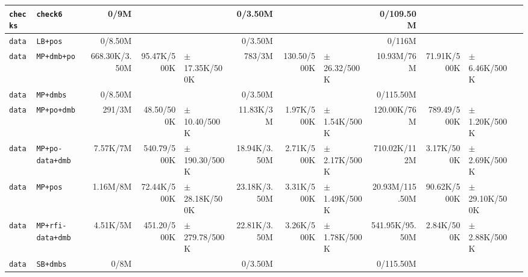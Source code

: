 \begin{tabular}{l l  | r r l | r r l | r r l l}
         \verb|checks| &                                               \verb|check6| &           0/9M &                       &                   &        0/3.50M &                       &                   &      0/109.50M &                       &                    & \\ \hline 
           \verb|data| &                                               \verb|LB+pos| &        0/8.50M &                       &                   &        0/3.50M &                       &                   &         0/116M &                       &                    & \\ \hline 
           \verb|data| &                                            \verb|MP+dmb+po| &  668.30K/3.50M &           95.47K/500K & $\pm$ 17.35K/500K &         783/3M &           130.50/500K &  $\pm$ 26.32/500K &     10.93M/76M &           71.91K/500K &   $\pm$ 6.46K/500K & \\ \hline 
           \verb|data| &                                              \verb|MP+dmbs| &        0/8.50M &                       &                   &        0/3.50M &                       &                   &      0/115.50M &                       &                    & \\ \hline 
           \verb|data| &                                            \verb|MP+po+dmb| &         291/3M &            48.50/500K &  $\pm$ 10.40/500K &      11.83K/3M &            1.97K/500K &  $\pm$ 1.54K/500K &    120.00K/76M &           789.49/500K &   $\pm$ 1.20K/500K & \\ \hline 
           \verb|data| &                                       \verb|MP+po-data+dmb| &       7.57K/7M &           540.79/500K & $\pm$ 190.30/500K &   18.94K/3.50M &            2.71K/500K &  $\pm$ 2.17K/500K &   710.02K/112M &            3.17K/500K &   $\pm$ 2.69K/500K & \\ \hline 
           \verb|data| &                                               \verb|MP+pos| &       1.16M/8M &           72.44K/500K & $\pm$ 28.18K/500K &   23.18K/3.50M &            3.31K/500K &  $\pm$ 1.49K/500K & 20.93M/115.50M &           90.62K/500K &  $\pm$ 29.10K/500K & \\ \hline 
           \verb|data| &                                      \verb|MP+rfi-data+dmb| &       4.51K/5M &           451.20/500K & $\pm$ 279.78/500K &   22.81K/3.50M &            3.26K/500K &  $\pm$ 1.78K/500K & 541.95K/95.50M &            2.84K/500K &   $\pm$ 2.88K/500K & \\ \hline 
           \verb|data| &                                              \verb|SB+dmbs| &           0/8M &                       &                   &        0/3.50M &                       &                   &      0/115.50M &                       &                    & \\ \hline 

\end{tabular}
